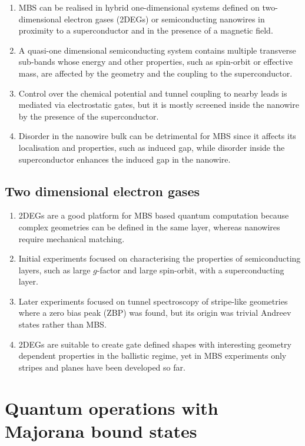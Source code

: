 \begin{enumerate}
\item MBS can be realised in hybrid one-dimensional systems defined on two-dimensional electron gases (2DEGs) or semiconducting nanowires in proximity to a superconductor and in the presence of a magnetic field.
\item A quasi-one dimensional semiconducting system contains multiple transverse sub-bands whose energy and other properties, such as spin-orbit or effective mass, are affected by the geometry and the coupling to the superconductor.
\item Control over the chemical potential and tunnel coupling to nearby leads is mediated via electrostatic gates, but it is mostly screened inside the nanowire by the presence of the superconductor.
\item Disorder in the nanowire bulk can be detrimental for MBS since it affects its localisation and properties, such as induced gap, while disorder inside the superconductor enhances the induced gap in the nanowire.
\end{enumerate}

\subsection{Two dimensional electron gases}

\begin{enumerate}
\item 2DEGs are a good platform for MBS based quantum computation because complex geometries can be defined in the same layer, whereas nanowires require mechanical matching.
\item Initial experiments focused on characterising the properties of semiconducting layers, such as large $g$-factor and large spin-orbit, with a superconducting layer.
\item Later experiments focused on tunnel spectroscopy of stripe-like geometries where a zero bias peak (ZBP) was found, but its origin was trivial Andreev states rather than MBS.
\item 2DEGs are suitable to create gate defined shapes with interesting geometry dependent properties in the ballistic regime, yet in MBS experiments only stripes and planes have been developed so far.
\end{enumerate}


\section{Quantum operations with Majorana bound states}

